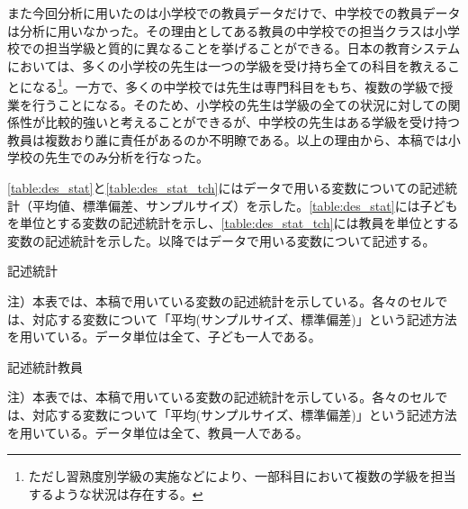 \documentclass[a4paper,12pt]{article}
\begin{document}
また今回分析に用いたのは小学校での教員データだけで、中学校での教員データは分析に用いなかった。その理由としてある教員の中学校での担当クラスは小学校での担当学級と質的に異なることを挙げることができる。日本の教育システムにおいては、多くの小学校の先生は一つの学級を受け持ち全ての科目を教えることになる\footnote{ただし習熟度別学級の実施などにより、一部科目において複数の学級を担当するような状況は存在する。}。一方で、多くの中学校では先生は専門科目をもち、複数の学級で授業を行うことになる。そのため、小学校の先生は学級の全ての状況に対しての関係性が比較的強いと考えることができるが、中学校の先生はある学級を受け持つ教員は複数おり誰に責任があるのか不明瞭である。以上の理由から、本稿では小学校の先生でのみ分析を行なった。


\ref{table:des_stat}と\ref{table:des_stat_tch}にはデータで用いる変数についての記述統計（平均値、標準偏差、サンプルサイズ）を示した。\ref{table:des_stat}には子どもを単位とする変数の記述統計を示し、\ref{table:des_stat_tch}には教員を単位とする変数の記述統計を示した。以降ではデータで用いる変数について記述する。

\begin{landscape}
\begin{table}[htbp]
\centering
\begin{adjustbox}{max width=1.5\textwidth}

\end{adjustbox}
\caption{記述統計}
\label{table:des_stat}
\begin{flushleft}
\footnotesize{
注）本表では、本稿で用いている変数の記述統計を示している。各々のセルでは、対応する変数について「平均(サンプルサイズ、標準偏差)」という記述方法を用いている。データ単位は全て、子ども一人である。
}
\end{flushleft}
\end{table}
\end{landscape}


\begin{table}[htbp]
\centering
\begin{adjustbox}{max width=1.5\textwidth}

\end{adjustbox}
\caption{記述統計教員}
\label{table:des_stat_tch}
\begin{flushleft}
\footnotesize{
注）本表では、本稿で用いている変数の記述統計を示している。各々のセルでは、対応する変数について「平均(サンプルサイズ、標準偏差)」という記述方法を用いている。データ単位は全て、教員一人である。
}
\end{flushleft}
\end{table}
\end{document}

